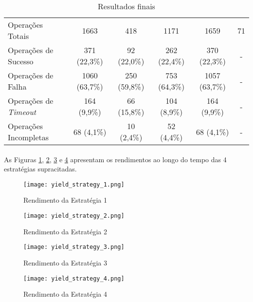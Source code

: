 \begin{table}[!htb]
\begin{center}
{\begin{tabular}{ l|c|c|c|c|c }
            Operações Totais                    & 1663          & 418           & 1171          & 1659          & 71 \\
            Operações de Sucesso                & 371 (22,3\%)  & 92 (22,0\%)   & 262 (22,4\%)  & 370 (22,3\%)  & - \\
            Operações de Falha                  & 1060 (63,7\%) & 250 (59,8\%)  & 753 (64,3\%)  & 1057 (63,7\%) & - \\
            Operações de \textit{Timeout}       & 164 (9,9\%)   & 66 (15,8\%)   & 104 (8,9\%)   & 164 (9,9\%)   & - \\
            Operações Incompletas               & 68 (4,1\%)    & 10 (2,4\%)    & 52 (4,4\%)    & 68 (4,1\%)    & - \\
        \end{tabular}}
        \caption{Resultados finais}
        \label{tab:395}
    \end{center}
\end{table}

\paragraph{} As Figuras \ref{fig:731}, \ref{fig:732}, \ref{fig:733} e \ref{fig:734} apresentam os rendimentos ao longo do tempo das 4 estratégias supracitadas.

\begin{figure}[!htb]
    \texttt{[image: yield\_strategy\_1.png]}
    \centering
    \caption{Rendimento da Estratégia 1}
    \label{fig:731}
\end{figure}

\begin{figure}[!htb]
    \texttt{[image: yield\_strategy\_2.png]}
    \centering
    \caption{Rendimento da Estratégia 2}
    \label{fig:732}
\end{figure}

\begin{figure}[!htb]
    \texttt{[image: yield\_strategy\_3.png]}
    \centering
    \caption{Rendimento da Estratégia 3}
    \label{fig:733}
\end{figure}

\begin{figure}[!htb]
    \texttt{[image: yield\_strategy\_4.png]}
    \centering
    \caption{Rendimento da Estratégia 4}
    \label{fig:734}
\end{figure}

